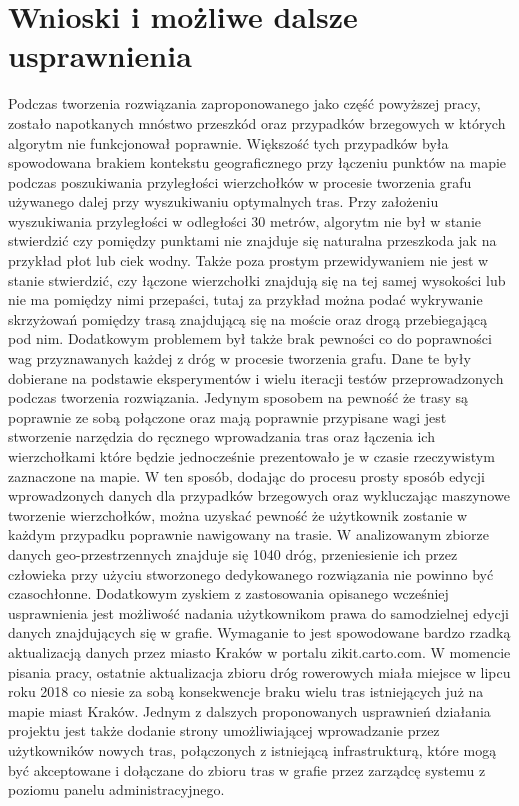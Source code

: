 \chapter{Wnioski i możliwe dalsze usprawnienia}
\label{cha:wnioski}

Podczas tworzenia rozwiązania zaproponowanego jako część powyższej pracy, zostało napotkanych mnóstwo przeszkód oraz przypadków brzegowych w których algorytm nie funkcjonował poprawnie. Większość tych przypadków była spowodowana brakiem kontekstu geograficznego przy łączeniu punktów na mapie podczas poszukiwania przyległości wierzchołków w procesie tworzenia grafu używanego dalej przy wyszukiwaniu optymalnych tras. Przy założeniu wyszukiwania przyległości w odległości 30 metrów, algorytm nie był w stanie stwierdzić czy pomiędzy punktami nie znajduje się naturalna przeszkoda jak na przykład płot lub ciek wodny. Także poza prostym przewidywaniem nie jest w stanie stwierdzić, czy łączone wierzchołki znajdują się na tej samej wysokości lub nie ma pomiędzy nimi przepaści, tutaj za przykład można podać wykrywanie skrzyżowań pomiędzy trasą znajdującą się na moście oraz drogą przebiegającą pod nim. Dodatkowym problemem był także brak pewności co do poprawności wag przyznawanych każdej z dróg w procesie tworzenia grafu. Dane te były dobierane na podstawie eksperymentów i wielu iteracji testów przeprowadzonych podczas tworzenia rozwiązania. \newline
Jedynym sposobem na pewność że trasy są poprawnie ze sobą połączone oraz mają poprawnie przypisane wagi jest stworzenie narzędzia do ręcznego wprowadzania tras oraz łączenia ich wierzchołkami które będzie jednocześnie prezentowało je w czasie rzeczywistym zaznaczone na mapie. W ten sposób, dodając do procesu prosty sposób edycji wprowadzonych danych dla przypadków brzegowych oraz wykluczając maszynowe tworzenie wierzchołków, można uzyskać pewność że użytkownik zostanie w każdym przypadku poprawnie nawigowany na trasie. W analizowanym zbiorze danych geo-przestrzennych znajduje się 1040 dróg, przeniesienie ich przez człowieka przy użyciu stworzonego dedykowanego rozwiązania nie powinno być czasochłonne. \newline
Dodatkowym zyskiem z zastosowania opisanego wcześniej usprawnienia jest możliwość nadania użytkownikom prawa do samodzielnej edycji danych znajdujących się w grafie. Wymaganie to jest spowodowane bardzo rzadką aktualizacją danych przez miasto Kraków w portalu zikit.carto.com. W momencie pisania pracy, ostatnie aktualizacja zbioru dróg rowerowych miała miejsce w lipcu roku 2018 co niesie za sobą konsekwencje braku wielu tras istniejących już na mapie miast Kraków. Jednym z dalszych proponowanych usprawnień działania projektu jest także dodanie strony umożliwiającej wprowadzanie przez użytkowników nowych tras, połączonych z istniejącą infrastrukturą, które mogą być akceptowane i dołączane do zbioru tras w grafie przez zarządcę systemu z poziomu panelu administracyjnego. \newline
